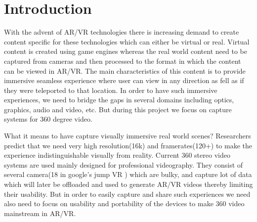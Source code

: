 \chapter{Introduction}

With the advent of AR/VR technologies there is increasing demand to create content specific for these technologies which can either be virtual or real. Virtual content is created using game engines whereas the real world content need to be captured from cameras and then processed to the format in which the content can be viewed in AR/VR. The main characteristics of this content is to provide immersive seamless experience where user can view in any direction as fell as if they were teleported to that location. In order to have such immersive experiences, we need to bridge the gaps in several domains including optics, graphics, audio and video, etc. But during this project we focus on capture systems for 360 degree video. \newline

What it means to have capture visually immersive real world scenes? Researchers \cite{cuervo2018creating} predict that we need very high resolution(16k) and framerates(120+) to make the experience indistinguishable visually from reality. Current 360 stereo video systems are used mainly designed for professional videography. They consist of several camera(18 in google's jump VR \cite{richardt2017video}) which are bulky, and capture lot of data which will later be offloaded and used to generate AR/VR videos thereby limiting their usability. But in order to easily capture and share such experiences we need also need to focus on usability and portability of the devices to make 360 video mainstream in AR/VR.

